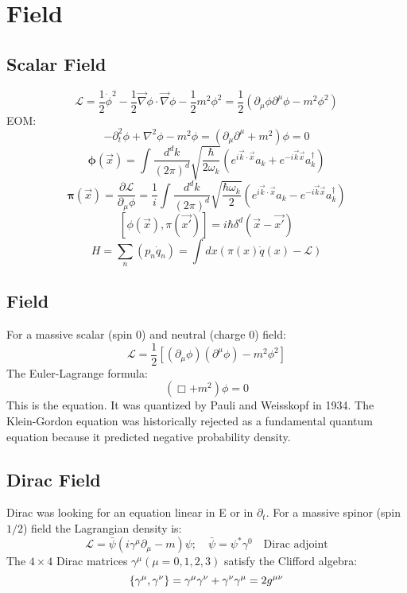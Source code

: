 \section{Field}
\subsection{Scalar Field}
$$ \mathcal{L} = \frac{1}{2}\dot{\phi}^{2} -
\frac{1}{2}\vec{\nabla}\phi \cdot \vec{\nabla}\phi - \frac{1}{2}m^{2}\phi^{2} 
= \frac{1}{2}(\partial_{\mu}\phi\partial^{\mu}\phi - m^{2}\phi^{2})$$
EOM:
$$ -\partial_{t}^{2}\phi + \nabla^{2}\phi - m^{2}\phi =
(\partial_{\mu}\partial^{\mu} + m^{2}) \phi = 0 $$
$$ \pmb{\phi}(\vec{x}) = \int
\frac{d^{d}k}{(2\pi)^{d}}\sqrt{\frac{\hbar}{2\omega_{k}}}(e^{i\vec{k}\cdot\vec{x}}a_{k}+e^{-i\vec{k}\vec{x}}a_{k}^{\dag})$$
$$ \pmb{\pi}(\vec{x}) = \frac{\partial{\mathcal{L}}}{\partial_{\mu}\phi} =
\frac{1}{i} \int \frac{d^{d}k}{(2\pi)^{d}}\sqrt{\frac{\hbar\omega_{k}}{2}}(e^{i\vec{k}\cdot\vec{x}}a_{k}-e^{-i\vec{k}\vec{x}}a_{k}^{\dag}) $$
$$ [\phi(\vec{x}), \pi(\vec{x'})] = i\hbar\delta^{d}(\vec{x} - \vec{x'})$$
$$ H =\sum_{n}(p_{n}\dot{q}_n) = \int dx(\pi(x)\dot{q}(x) -
\mathcal{L})  $$


\subsection{\KG{} Field}
For a massive scalar (spin 0) and neutral (charge 0) field:
$$\mathcal{L} = \frac{1}{2} [(\partial_{\mu}\phi)(\partial^{\mu}\phi) -
m^{2} \phi^{2}]$$
The Euler-Lagrange formula:
$$ (\Box + m^{2})\phi = 0$$
This is the \KG{} equation. It was quantized by Pauli and Weisskopf in 1934.
The Klein-Gordon equation was historically rejected as a fundamental quantum
equation because it predicted negative probability density.

\subsection{Dirac Field}
Dirac was looking for an equation linear in E or in $\partial_t$. For a
massive spinor (spin $1/2$) field the Lagrangian density is:
$$ \mathcal{L} = \bar{\psi}(i\gamma^{\mu}\partial_{\mu} - m)\psi; \quad
\bar{\psi} = \psi^{*}\gamma^{0} \quad \text{Dirac adjoint} $$
The $4 \times 4$ Dirac matrices $\gamma^{\mu} (\mu = 0,1,2,3)$ satisfy the
Clifford algebra:
\[ 
    \{\gamma^{\mu},\gamma^{\nu}\}=\gamma^{\mu}\gamma^{\nu}+\gamma^{\nu}\gamma^{\mu}=2g^{\mu\nu} 
\]

